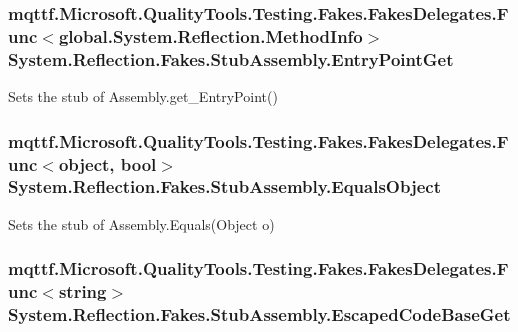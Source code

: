 \hypertarget{class_system_1_1_reflection_1_1_fakes_1_1_stub_assembly_ad7279a7c15efb00a475fde3fd09a36cd}{
\subsubsection[{Entry\-Point\-Get}]{\setlength{\rightskip}{0pt plus 5cm}mqttf.\-Microsoft.\-Quality\-Tools.\-Testing.\-Fakes.\-Fakes\-Delegates.\-Func$<$global.\-System.\-Reflection.\-Method\-Info$>$ System.\-Reflection.\-Fakes.\-Stub\-Assembly.\-Entry\-Point\-Get}}\label{class_system_1_1_reflection_1_1_fakes_1_1_stub_assembly_ad7279a7c15efb00a475fde3fd09a36cd}


Sets the stub of Assembly.\-get\-\_\-\-Entry\-Point()

\hypertarget{class_system_1_1_reflection_1_1_fakes_1_1_stub_assembly_a856ccf88b4e43c0417e32c58994fdc6a}{
\subsubsection[{Equals\-Object}]{\setlength{\rightskip}{0pt plus 5cm}mqttf.\-Microsoft.\-Quality\-Tools.\-Testing.\-Fakes.\-Fakes\-Delegates.\-Func$<$object, bool$>$ System.\-Reflection.\-Fakes.\-Stub\-Assembly.\-Equals\-Object}}\label{class_system_1_1_reflection_1_1_fakes_1_1_stub_assembly_a856ccf88b4e43c0417e32c58994fdc6a}


Sets the stub of Assembly.\-Equals(\-Object o)

\hypertarget{class_system_1_1_reflection_1_1_fakes_1_1_stub_assembly_a5d07087a773b29c8bf8d8905d6c83ecd}{
\subsubsection[{Escaped\-Code\-Base\-Get}]{\setlength{\rightskip}{0pt plus 5cm}mqttf.\-Microsoft.\-Quality\-Tools.\-Testing.\-Fakes.\-Fakes\-Delegates.\-Func$<$string$>$ System.\-Reflection.\-Fakes.\-Stub\-Assembly.\-Escaped\-Code\-Base\-Get}}\label{class_system_1_1_reflection_1_1_fakes_1_1_stub_assembly_a5d07087a773b29c8bf8d8905d6c83ecd}


